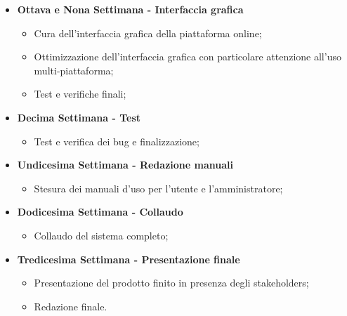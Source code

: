 {\begin{itemize}
        \item \textbf{Ottava e Nona Settimana - Interfaccia grafica} 
        \begin{itemize}
            \item Cura dell'interfaccia grafica della piattaforma online;
            \item Ottimizzazione dell'interfaccia grafica con particolare attenzione all'uso multi-piattaforma;
            \item Test e verifiche finali;
        \end{itemize}
        \item \textbf{Decima Settimana - Test} 
        \begin{itemize}
            \item Test e verifica dei bug e finalizzazione;
        \end{itemize}
        \item \textbf{Undicesima Settimana - Redazione manuali} 
        \begin{itemize}
            \item Stesura dei manuali d'uso per l'utente e l'amministratore;
        \end{itemize}
        \item \textbf{Dodicesima Settimana - Collaudo} 
        \begin{itemize}
            \item Collaudo del sistema completo;
        \end{itemize}
        \item \textbf{Tredicesima Settimana - Presentazione finale} 
        \begin{itemize}
            \item Presentazione del prodotto finito in presenza degli stakeholders;
            \item Redazione finale.
        \end{itemize}
    \end{itemize}
}

\newcommand{\totaleOre}{308}

\newcommand{\obiettiviObbligatori}{
	 \item \underline{\textit{O01}}: primo obiettivo;
	 \item \underline{\textit{O02}}: secondo obiettivo;
	 \item \underline{\textit{O03}}: terzo obiettivo;
	 
}

\newcommand{\obiettiviDesiderabili}{
	 \item \underline{\textit{D01}}: primo obiettivo;
	 \item \underline{\textit{D02}}: secondo obiettivo;
}

\newcommand{\obiettiviFacoltativi}{
	 \item \underline{\textit{F01}}: primo obiettivo;
	 \item \underline{\textit{F02}}: secondo obiettivo;
	 \item \underline{\textit{F03}}: terzo obiettivo;
}
